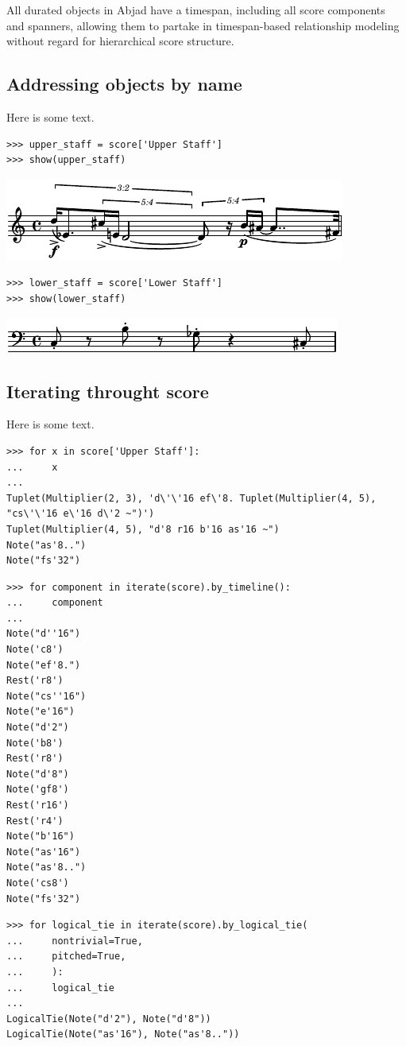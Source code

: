 All durated objects in Abjad have a timespan, including all score components
and spanners, allowing them to partake in timespan-based relationship modeling
without regard for hierarchical score structure.

\subsection{Addressing objects by name}

Here is some text.

\begin{lstlisting}
>>> upper_staff = score['Upper Staff']
>>> show(upper_staff)
\end{lstlisting}

\includegraphics[scale=1.0]{images/score_addressability-1.pdf}


\begin{lstlisting}
>>> lower_staff = score['Lower Staff']
>>> show(lower_staff)
\end{lstlisting}

\includegraphics[scale=1.0]{images/score_addressability-2.pdf}


\subsection{Iterating throught score}

Here is some text.

\begin{lstlisting}
>>> for x in score['Upper Staff']:
...     x
... 
Tuplet(Multiplier(2, 3), 'd\'\'16 ef\'8. Tuplet(Multiplier(4, 5), "cs\'\'16 e\'16 d\'2 ~")')
Tuplet(Multiplier(4, 5), "d'8 r16 b'16 as'16 ~")
Note("as'8..")
Note("fs'32")
\end{lstlisting}


\begin{lstlisting}
>>> for component in iterate(score).by_timeline():
...     component
... 
Note("d''16")
Note('c8')
Note("ef'8.")
Rest('r8')
Note("cs''16")
Note("e'16")
Note("d'2")
Note('b8')
Rest('r8')
Note("d'8")
Note('gf8')
Rest('r16')
Rest('r4')
Note("b'16")
Note("as'16")
Note("as'8..")
Note('cs8')
Note("fs'32")
\end{lstlisting}


\begin{lstlisting}
>>> for logical_tie in iterate(score).by_logical_tie(
...     nontrivial=True,
...     pitched=True,
...     ):
...     logical_tie
... 
LogicalTie(Note("d'2"), Note("d'8"))
LogicalTie(Note("as'16"), Note("as'8.."))
\end{lstlisting}

